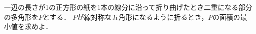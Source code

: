 \documentclass[../../main.tex]{subfiles}
\begin{document}
一辺の長さが1の正方形の紙を1本の線分に沿って折り曲げたとき二重になる部分の多角形を$P$とする．
$P$が線対称な五角形になるように折るとき，$P$の面積の最小値を求めよ．
\end{document}
